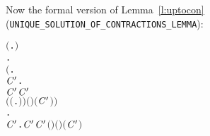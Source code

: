 Now the formal version of Lemma~\ref{l:uptocon} (\texttt{UNIQUE_SOLUTION_OF_CONTRACTIONS_LEMMA}):
\begin{alltt}
\HOLTokenTurnstile{} \ensuremath{(}\HOLSymConst{\HOLTokenExists{}}.   \HOLSymConst{\HOLTokenConj{}}  \HOLSymConst{\HOLTokenContracts{}}   \HOLSymConst{\HOLTokenConj{}}  \HOLSymConst{\HOLTokenContracts{}}  \ensuremath{)} \HOLSymConst{\HOLTokenImp{}}
   \HOLSymConst{\HOLTokenForall{}}.
         \HOLSymConst{\HOLTokenImp{}}
       \ensuremath{(}\HOLSymConst{\HOLTokenForall{}} .
              \HOLTokenWeakTransBegin{} \HOLTokenWeakTransEnd {} \HOLSymConst{\HOLTokenImp{}}
            \HOLSymConst{\HOLTokenExists{}}\ensuremath{\HOLBoundVar{C}\sp{\prime}}.
                 \ensuremath{\HOLBoundVar{C}\sp{\prime}} \HOLSymConst{\HOLTokenConj{}}  \HOLSymConst{\HOLTokenContracts{}} \ensuremath{\HOLBoundVar{C}\sp{\prime}}  \HOLSymConst{\HOLTokenConj{}}
                \ensuremath{(} \HOLSymConst{\HOLTokenRCompose{}} \ensuremath{(}\HOLTokenLambda{} .  \HOLTokenWeakTransBegin{} \HOLTokenWeakTransEnd {}\ensuremath{)}\ensuremath{)} \ensuremath{(} \ensuremath{)} \ensuremath{(}\ensuremath{\HOLBoundVar{C}\sp{\prime}} \ensuremath{)}\ensuremath{)} \HOLSymConst{\HOLTokenConj{}}
       \HOLSymConst{\HOLTokenForall{}}.
             \HOLTokenWeakTransBegin\HOLSymConst{\ensuremath{\tau}}\HOLTokenWeakTransEnd {} \HOLSymConst{\HOLTokenImp{}}
           \HOLSymConst{\HOLTokenExists{}}\ensuremath{\HOLBoundVar{C}\sp{\prime}}.  \ensuremath{\HOLBoundVar{C}\sp{\prime}} \HOLSymConst{\HOLTokenConj{}}  \HOLSymConst{\HOLTokenContracts{}} \ensuremath{\HOLBoundVar{C}\sp{\prime}}  \HOLSymConst{\HOLTokenConj{}} \ensuremath{(} \HOLSymConst{\HOLTokenRCompose{}} \ensuremath{)} \ensuremath{(} \ensuremath{)} \ensuremath{(}\ensuremath{\HOLBoundVar{C}\sp{\prime}} \ensuremath{)}
\end{alltt}


